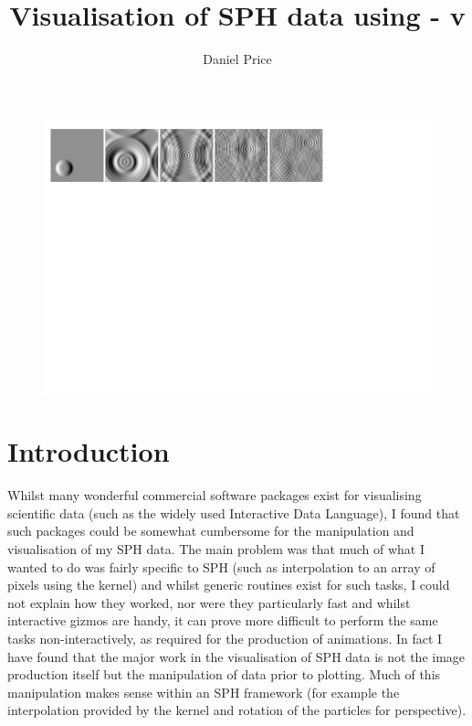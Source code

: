 \documentclass[a4paper,10pt]{article}
\title{Visualisation of SPH data using \splash - v}
\author{Daniel Price}
\begin{document}
\begin{figure}
\begin{center}
\includegraphics[width=\textwidth]{hyperbolic.pdf}
\end{center}
\end{figure}
\maketitle
\tableofcontents
\newpage

\section{Introduction}
 Whilst many wonderful commercial software packages exist for visualising scientific
data (such as the widely used Interactive Data Language), I found that such packages
could be somewhat cumbersome for the manipulation and visualisation of my SPH data. The
main problem was that much of what I wanted to do was fairly specific to SPH (such as
interpolation to an array of pixels using the kernel) and whilst generic routines exist
for such tasks, I could not explain how they worked, nor were they
particularly fast and whilst interactive gizmos are handy, it can prove more difficult to perform the
same tasks non-interactively, as required for the production of animations. 
In fact I have found that the major work in the visualisation of SPH data is not the image production itself but the
manipulation of data prior to plotting. Much of this manipulation makes sense
within an SPH framework (for example the interpolation provided by the kernel
and rotation of the particles for perspective).
\end{document}
